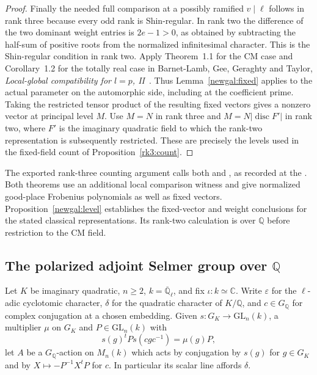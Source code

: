 \begin{proof}
Finally the needed full comparison at a possibly ramified
$v\mid\ell$ follows in rank three because every odd rank is
Shin-regular. In rank two the difference of the two dominant weight
entries is $2e-1>0$, as obtained by subtracting the half-sum of
positive roots from the normalized infinitesimal character. This is
the Shin-regular condition in rank two. Apply Theorem~1.1 for the CM
case and Corollary~1.2 for the totally real case in
Barnet-Lamb,
Gee, Geraghty and Taylor, \emph{Local-global compatibility for $l=p$, II}~\cite{blggtLocal}.
Thus Lemma~\ref{newgal:fixed} applies to the actual parameter on the
automorphic side, including at the coefficient prime. Taking the restricted
tensor product of the resulting fixed vectors gives a nonzero vector
at principal level $M$. Use $M=N$ in rank three and
$M=N|\operatorname{disc}F'|$ in rank two, where $F'$ is the imaginary
quadratic field to which the rank-two representation is subsequently
restricted. These are precisely the levels used in the fixed-field
count of Proposition~\ref{rk3:count}.
\end{proof}

The exported rank-three counting argument calls both
and ,
as recorded at the
.
Both theorems use an additional local comparison witness and give
normalized good-place Frobenius polynomials as well as fixed vectors.
Proposition~\ref{newgal:level} establishes the fixed-vector and weight
conclusions for the stated classical representations. Its rank-two
calculation is over $\mathbb Q$ before restriction to the CM field.

\subsection{The polarized adjoint Selmer group over \texorpdfstring{$\mathbb Q$}{Q}}

Let $K$ be imaginary quadratic, $n\ge2$, $k=\overline{\mathbb Q}_\ell$,
and fix $\iota:k\simeq\mathbb C$. Write $\varepsilon$ for the $\ell$-adic
cyclotomic character, $\delta$ for the quadratic character of $K/\mathbb Q$,
and $c\in G_{\mathbb Q}$ for complex conjugation at a chosen embedding.
Given $s:G_K\to\mathrm{GL}_n(k)$, a multiplier $\mu$ on $G_K$ and
$P\in\mathrm{GL}_n(k)$ with
\[
 s(g)^t P s(cgc^{-1})=\mu(g)P ,
\]
let $A$ be a $G_{\mathbb Q}$-action on $M_n(k)$ which acts by conjugation
by $s(g)$ for $g\in G_K$ and by $X\mapsto-P^{-1}X^tP$ for $c$. In
particular its scalar line affords $\delta$.

